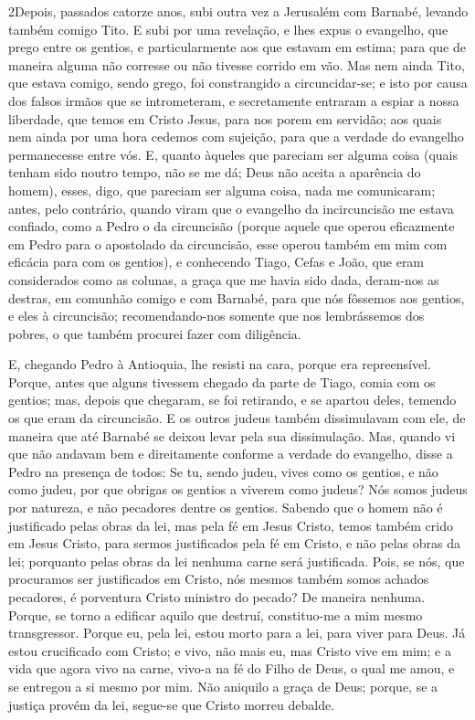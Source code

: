 \lettrine{2} Depois, passados catorze anos, subi outra vez a
Jerusalém com Barnabé, levando também comigo Tito. E subi por
uma revelação, e lhes expus o evangelho, que prego entre os gentios,
e particularmente aos que estavam em estima; para que de maneira
alguma não corresse ou não tivesse corrido em vão. Mas nem ainda
Tito, que estava comigo, sendo grego, foi constrangido a
circuncidar-se; e isto por causa dos falsos irmãos que se
intrometeram, e secretamente entraram a espiar a nossa liberdade,
que temos em Cristo Jesus, para nos porem em servidão; aos quais
nem ainda por uma hora cedemos com sujeição, para que a verdade do
evangelho permanecesse entre vós. E, quanto àqueles que pareciam
ser alguma coisa (quais tenham sido noutro tempo, não se me dá; Deus
não aceita a aparência do homem), esses, digo, que pareciam ser
alguma coisa, nada me comunicaram; antes, pelo contrário, quando
viram que o evangelho da incircuncisão me estava confiado, como a
Pedro o da circuncisão (porque aquele que operou eficazmente em
Pedro para o apostolado da circuncisão, esse operou também em mim
com eficácia para com os gentios), e conhecendo Tiago, Cefas e
João, que eram considerados como as colunas, a graça que me havia
sido dada, deram-nos as destras, em comunhão comigo e com Barnabé,
para que nós fôssemos aos gentios, e eles à circuncisão;
recomendando-nos somente que nos lembrássemos dos pobres, o
que também procurei fazer com diligência.

E, chegando Pedro à Antioquia, lhe resisti na cara, porque era
repreensível. Porque, antes que alguns tivessem chegado da
parte de Tiago, comia com os gentios; mas, depois que chegaram, se
foi retirando, e se apartou deles, temendo os que eram da
circuncisão. E os outros judeus também dissimulavam com ele,
de maneira que até Barnabé se deixou levar pela sua dissimulação.
Mas, quando vi que não andavam bem e direitamente conforme a
verdade do evangelho, disse a Pedro na presença de todos: Se tu,
sendo judeu, vives como os gentios, e não como judeu, por que
obrigas os gentios a viverem como judeus? Nós somos judeus
por natureza, e não pecadores dentre os gentios. Sabendo que
o homem não é justificado pelas obras da lei, mas pela fé em Jesus
Cristo, temos também crido em Jesus Cristo, para sermos justificados
pela fé em Cristo, e não pelas obras da lei; porquanto pelas obras
da lei nenhuma carne será justificada. Pois, se nós, que
procuramos ser justificados em Cristo, nós mesmos também somos
achados pecadores, é porventura Cristo ministro do pecado? De
maneira nenhuma. Porque, se torno a edificar aquilo que
destruí, constituo-me a mim mesmo transgressor. Porque eu,
pela lei, estou morto para a lei, para viver para Deus. Já
estou crucificado com Cristo; e vivo, não mais eu, mas Cristo vive
em mim; e a vida que agora vivo na carne, vivo-a na fé do Filho de
Deus, o qual me amou, e se entregou a si mesmo por mim. Não
aniquilo a graça de Deus; porque, se a justiça provém da lei,
segue-se que Cristo morreu debalde.

